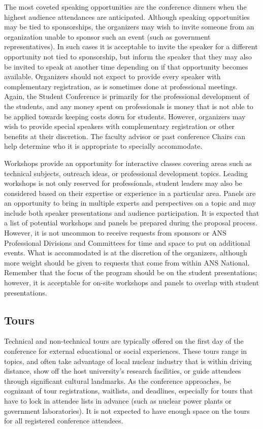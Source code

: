 \documentclass[12pt]{article}
\begin{document}
The most coveted speaking opportunities are the conference dinners when the highest audience attendances are anticipated.
Although speaking opportunities may be tied to sponsorships, the organizers may wish to invite someone from an organization unable to sponsor such an event (such as government representatives).
In such cases it is acceptable to invite the speaker for a different opportunity not tied to sponsorship, but inform the speaker that they may also be invited to speak at another time depending on if that opportunity becomes available.
Organizers should not expect to provide every speaker with complementary registration, as is sometimes done at professional meetings.
Again, the Student Conference is primarily for the professional development of the students, and any money spent on professionals is money that is not able to be applied towards keeping costs down for students.
However, organizers may wish to provide special speakers with complementary registration or other benefits at their discretion.
The faculty advisor or past conference Chairs can help determine who it is appropriate to specially accommodate. 

Workshops provide an opportunity for interactive classes covering areas such as technical subjects, outreach ideas, or professional development topics. 
Leading workshops is not only reserved for professionals, student leaders may also be considered based on their expertise or experience in a particular area. 
Panels are an opportunity to bring in multiple experts and perspectives on a topic and may include both speaker presentations and audience participation.
It is expected that a list of potential workshops and panels be prepared during the proposal process.
However, it is not uncommon to receive requests from sponsors or ANS Professional Divisions and Committees for time and space to put on additional events.
What is accommodated is at the discretion of the organizers, although more weight should be given to requests that come from within ANS National.
Remember that the focus of the program should be on the student presentations; however, it is acceptable for on-site workshops and panels to overlap with student presentations.

\subsection{Tours}
Technical and non-technical tours are typically offered on the first day of the conference for external educational or social experiences.
These tours range in topics, and often take advantage of local nuclear industry that is within driving distance, show off the host university’s research facilities, or guide attendees through significant cultural landmarks. 
As the conference approaches, be cognizant of tour registrations, waitlists, and deadlines, especially for tours that have to lock in attendee lists in advance (such as nuclear power plants or government laboratories).
It is not expected to have enough space on the tours for all registered conference attendees. 
\end{document}
